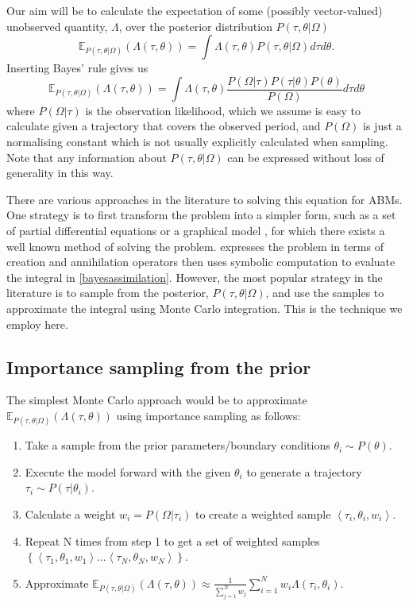 \documentclass{article}
\begin{document}
Our aim will be to calculate the expectation of some (possibly vector-valued) unobserved quantity, $\Lambda$, over the posterior distribution $P(\tau,\theta | \Omega)$
\begin{equation}
\mathbb{E}_{P(\tau,\theta|\Omega)}(\Lambda(\tau,\theta)) = \int \Lambda(\tau,\theta) P(\tau,\theta|\Omega) d\tau d\theta.
\label{expectation}
\end{equation}
Inserting Bayes' rule gives us
\begin{equation}
\mathbb{E}_{P(\tau,\theta|\Omega)}(\Lambda(\tau,\theta)) = \int \Lambda(\tau,\theta) \frac{P(\Omega|\tau)P(\tau|\theta)P(\theta)}{P(\Omega)} d\tau d\theta
\label{bayesassimilation}
\end{equation}
where $P(\Omega|\tau)$ is the observation likelihood, which we assume is easy to calculate given a trajectory that covers the observed period, and $P(\Omega)$ is just a normalising constant which is not usually explicitly calculated when sampling. Note that any information about $P(\tau,\theta | \Omega)$ can be expressed without loss of generality in this way.

There are various approaches in the literature to solving this equation for ABMs. One strategy is to first transform the problem into a simpler form, such as a set of partial differential equations \citep{lloyd_exploring_2016} or a graphical model \citep{liao2010integrated}, for which there exists a well known method of solving the problem. \citet{tang2019data} expresses the problem in terms of creation and annihilation operators then uses symbolic computation to evaluate the integral in \eqref{bayesassimilation}. However, the most popular strategy in the literature is to sample from the posterior, $P(\tau,\theta|\Omega)$, and use the samples to approximate the integral using Monte Carlo integration. This is the technique we employ here.

\subsection{Importance sampling from the prior}
The simplest Monte Carlo approach would be to approximate $\mathbb{E}_{P(\tau,\theta|\Omega)}(\Lambda(\tau,\theta))$ using importance sampling as follows:
\begin{enumerate}
\item Take a sample from the prior parameters/boundary conditions $\theta_i \sim P(\theta)$.
\item Execute the model forward with the given $\theta_i$ to generate a trajectory $\tau_{i} \sim P(\tau|\theta_i)$.
\item Calculate a weight $w_i = P(\Omega|\tau_i)$ to create a weighted sample $\left<\tau_{i},\theta_i, w_i\right>$.
\item Repeat  N times from step 1 to get a set of weighted samples $\left\{\left<\tau_1,\theta_1,w_1\right> \dots \left<\tau_N,\theta_N,w_N\right> \right\}$.
\item Approximate $\mathbb{E}_{P(\tau,\theta|\Omega)}(\Lambda(\tau,\theta)) \approx \frac{1}{\sum_{j=1}^Nw_j}\sum_{i=1}^N w_i\Lambda(\tau_i,\theta_i)$.
\end{enumerate}
\end{document}
